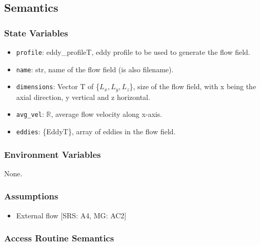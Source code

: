\documentclass[12pt, titlepage]{article}
\begin{document}
\subsection{Semantics}

\subsubsection{State Variables}
\begin{itemize}
  \item \texttt{profile}: eddy\_profileT, eddy profile to be used to generate the flow field.
  \item \texttt{name}: str, name of the flow field (is also filename).
  \item \texttt{dimensions}: Vector T of \{$L_x, L_y, L_z$\}, size of the flow field, with x being the axial direction, y vertical and z horizontal.
  \item \texttt{avg\_vel}: $\mathbb{R}$, average flow velocity along x-axis.
  \item \texttt{eddies}: \{EddyT\}, array of eddies in the flow field.
\end{itemize}

\subsubsection{Environment Variables}
None.

\subsubsection{Assumptions}
\begin{itemize}
  \item External flow [SRS: A4, MG: AC2]
\end{itemize}

\subsubsection{Access Routine Semantics}
\end{document}
